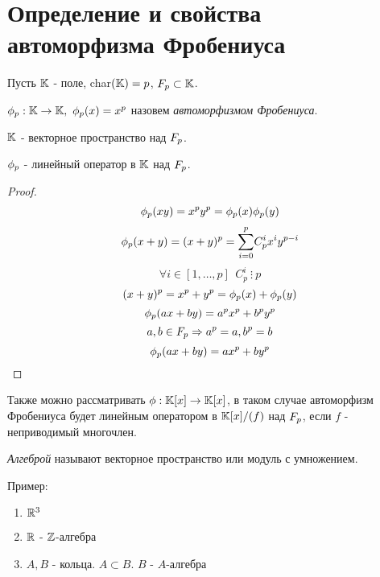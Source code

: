 \section{Определение и свойства автоморфизма Фробениуса}

Пусть $ \mathbb{K} $ - поле, char$(\mathbb{K}) = p $,  $ F_{p} \subset \mathbb{K} $.

\begin{defn}
  $ \phi_{p} : \mathbb{K} \rightarrow \mathbb{K}, ~ \phi_{p}(x) = x^p $ назовем \emph{автоморфизмом Фробениуса}. 
\end{defn}

$ \mathbb{K} $ - векторное пространство над $ F_{p} $.

\begin{thm}
  $ \phi_{p} $ - линейный оператор в $ \mathbb{K} $ над $ F_{p} $.
\end{thm}

\begin{proof}
     \[ \phi_{p}(xy) = x^py^p = \phi_{p}(x)\phi_{p}(y) \]
     \[ \phi_{p}(x + y) = (x + y)^p = \underset{i = 0}{\overset{p}\sum}C_{p}^{i}x^{i}y^{p-i} \] 
     \[ \forall i \in [1,\dots,p] ~~  C_{p}^{i} ~ \vdots ~ p \]  
     \[ (x+y)^p = x^p + y^p = \phi_{p}(x) + \phi_{p}(y) \] \newline
     \[ \phi_{p}(ax + by) = a^px^p + b^py^p \]
     \[ a, b \in F_{p} \Rightarrow a^p = a, b^p = b \]
     \[ \phi_{p}(ax + by) = ax^p + by^p \]
\end{proof}

Также можно рассматривать $ \phi : \mathbb{K}[x] \rightarrow \mathbb{K}[x] $, в таком случае автоморфизм Фробениуса 
будет линейным оператором в $ \mathbb{K}[x]/(f) $ над $ F_{p} $, если $ f $ - неприводимый многочлен. 

\begin{defn}
  \emph{Алгеброй} называют векторное пространство или модуль с умножением.
\end{defn}

Пример:

\begin{enumerate}
  \item $ \mathbb{R}^3 $
  \item $ \mathbb{R} $ - $\mathbb{Z}$-алгебра
  \item $ A, B $ - кольца. $ A \subset B $. $ B $ - $A$-алгебра
\end{enumerate}

